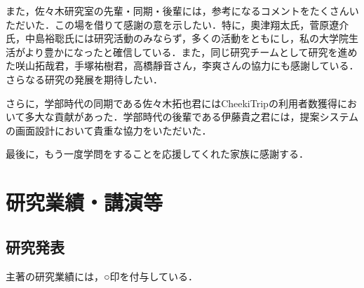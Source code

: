 \documentclass{jsarticle}
\begin{document}
また，佐々木研究室の先輩・同期・後輩には，参考になるコメントをたくさんいただいた．この場を借りて感謝の意を示したい．特に，奧津翔太氏，菅原遼介氏，中島裕聡氏には研究活動のみならず，多くの活動をともにし，私の大学院生活がより豊かになったと確信している．また，同じ研究チームとして研究を進めた咲山拓哉君，手塚祐樹君，高橋靜音さん，李爽さんの協力にも感謝している．さらなる研究の発展を期待したい．

さらに，学部時代の同期である佐々木拓也君にはCheekiTripの利用者数獲得において多大な貢献があった．学部時代の後輩である伊藤貴之君には，提案システムの画面設計において貴重な協力をいただいた．

最後に，もう一度学問をすることを応援してくれた家族に感謝する．

\newpage

\section*{研究業績・講演等}

\subsection*{研究発表}

主著の研究業績には，○印を付与している．
\end{document}

